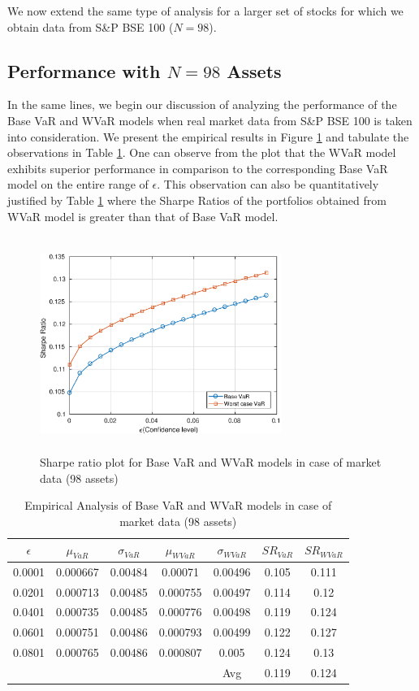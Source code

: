 We now extend the same type of analysis for a larger set of stocks for which we obtain data from S\&P BSE 100 ($N = 98$).

\subsection{Performance with $N=98$ Assets}
In the same lines, we begin our discussion of analyzing the performance of the Base VaR and WVaR models when real market data from S\&P BSE 100 is taken into consideration. We present the empirical results in Figure \ref{fig:5.4} and tabulate the observations in Table \ref{tab:5.4}. One can observe from the plot that the WVaR model exhibits superior performance in comparison to the corresponding Base VaR model on the entire range of $\epsilon$. This observation can also be quantitatively justified by Table \ref{tab:5.4} where the Sharpe Ratios of the portfolios obtained from WVaR model is greater than that of Base VaR model.
\begin{figure}[!h]
\centering
\includegraphics[height=7.0cm,width=0.7\textwidth]{VaR/bse100_market/sr_cheb.eps}
\caption{Sharpe ratio plot for Base VaR and WVaR models in case of market data (98 assets)}
\label{fig:5.4}
\end{figure}

\begin{table}[!h]
\centering
\captionsetup{justification=centering}
\begin{tabular}{||c|c|c|c|c|c|c||}
\hline
$\epsilon$ & $\mu_{VaR}$ & $\sigma_{VaR}$ & $\mu_{WVaR}$ & $\sigma_{WVaR}$ & $SR_{VaR}$ & $SR_{WVaR}$\\
\hline
0.0001 & 0.000667 & 0.00484 & 0.00071 & 0.00496 & 0.105 & 0.111 \\ 
0.0201 & 0.000713 & 0.00485 & 0.000755 & 0.00497 & 0.114 & 0.12 \\
0.0401 & 0.000735 & 0.00485 & 0.000776 & 0.00498 & 0.119 & 0.124 \\
0.0601 & 0.000751 & 0.00486 & 0.000793 & 0.00499 & 0.122 & 0.127 \\
0.0801 & 0.000765 & 0.00486 & 0.000807 & 0.005 & 0.124 & 0.13 \\
\hline
& & & & Avg & 0.119 & 0.124 \\
\hline
\end{tabular}
\caption{Empirical Analysis of Base VaR and WVaR models in case of market data (98 assets)}
\label{tab:5.4}
\end{table}

